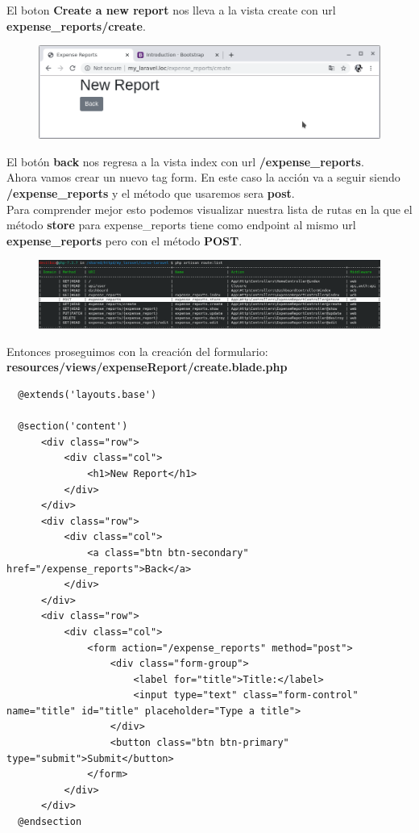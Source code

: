 \documentclass{article}
\begin{document}
El boton \textbf{Create a new report} nos lleva a la vista create con url
\textbf{expense\_reports/create}.

\begin{figure}[h!]
  \centering
  \includegraphics[scale=0.5]{./Pictures/056_new_report_btn_back.png}
\end{figure}

El botón \textbf{back} nos regresa a la vista index con url
\textbf{/expense\_reports}.\\

Ahora vamos crear un nuevo tag form. En este caso la acción va a seguir siendo
\textbf{/expense_reports} y el método que usaremos sera \textbf{post}.\\

Para comprender mejor esto podemos visualizar nuestra lista de rutas en la que
el método \textbf{store} para expense\_reports tiene como endpoint al mismo url
\textbf{expense\_reports} pero con el método \textbf{POST}.\\

\begin{figure}[h!]
  \centering
  \includegraphics[scale=0.5]{./Pictures/057_store_post.png}
\end{figure}

Entonces proseguimos con la creación del formulario:\\

\textbf{resources/views/expenseReport/create.blade.php}
\begin{verbatim}
  @extends('layouts.base')

  @section('content')
      <div class="row">
          <div class="col">
              <h1>New Report</h1>
          </div>
      </div>
      <div class="row">
          <div class="col">
              <a class="btn btn-secondary" href="/expense_reports">Back</a>
          </div>
      </div>
      <div class="row">
          <div class="col">
              <form action="/expense_reports" method="post">
                  <div class="form-group">
                      <label for="title">Title:</label>
                      <input type="text" class="form-control" name="title" id="title" placeholder="Type a title">
                  </div>
                  <button class="btn btn-primary" type="submit">Submit</button>
              </form>
          </div>
      </div>
  @endsection
\end{verbatim}
\end{document}
